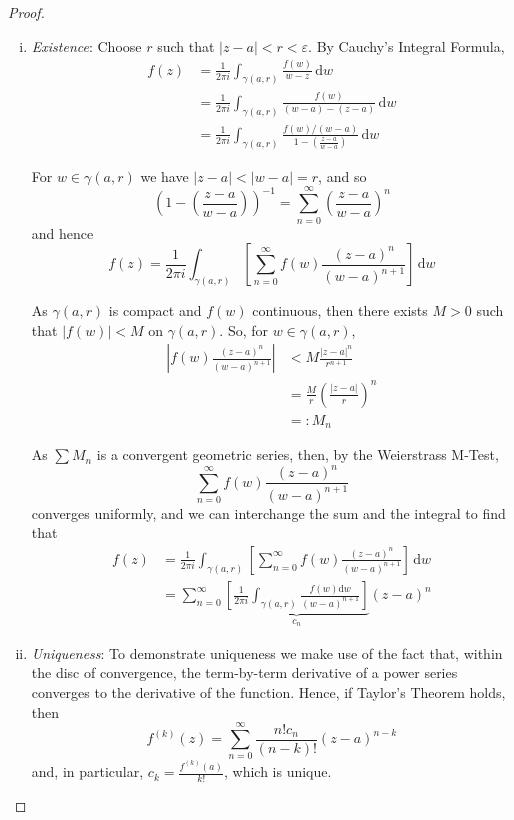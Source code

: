 \documentclass[10pt,fleqn]{article}
\newcommand{\diff}{\,\mathrm{d}}
\newcommand{\eps}{\varepsilon}
\theoremstyle{definition} \newtheorem{defn}{Definition}[section]
\theoremstyle{plain}      \newtheorem{thm}[defn]{Theorem}
\theoremstyle{definition} \newtheorem{prop}[defn]{Proposition}
\theoremstyle{plain}      \newtheorem{lem}[defn]{Lemma}
\theoremstyle{definition} \newtheorem{cor}[defn]{Corollary}
\theoremstyle{definition} \newtheorem{ex}[defn]{Example}
\theoremstyle{definition} \newtheorem{rem}[defn]{Remark}
\begin{document}
\begin{proof}
    \begin{enumerate}[(i)]
        \item \emph{Existence}:
        Choose $r$ such that $|z-a|<r<\eps$.
        By Cauchy's Integral Formula,
        \begin{align*}
            f(z)
            &=
            \frac{1}{2\pi i}\int_{\gamma(a,r)}\frac{f(w)}{w-z}\diff w\\
            &=
            \frac{1}{2\pi i}\int_{\gamma(a,r)}\frac{f(w)}{(w-a)-(z-a)}\diff w\\
            &=
            \frac{1}{2\pi i}\int_{\gamma(a,r)}\frac{f(w)/(w-a)}{1-\left(\frac{z-a}{w-a}\right)}\diff w
        \end{align*}

        For $w\in\gamma(a,r)$ we have $|z-a|<|w-a|=r$, and so
        \[
            \left(1-\left(\frac{z-a}{w-a}\right)\right)^{-1}=
            \sum_{n=0}^{\infty}\left(\frac{z-a}{w-a}\right)^n
        \]
        and hence
        \[
            f(z)=
            \frac{1}{2\pi i}\int_{\gamma(a,r)}\left[\sum_{n=0}^{\infty}f(w)\frac{(z-a)^n}{(w-a)^{n+1}}\right]\diff w
        \]

        As $\gamma(a,r)$ is compact and $f(w)$ continuous, then there exists $M>0$ such that $|f(w)|<M$ on $\gamma(a,r)$.
        So, for $w\in\gamma(a,r)$,
        \begin{align*}
            \left|f(w)\frac{(z-a)^n}{(w-a)^{n+1}}\right|
            &<
            M\frac{|z-a|^n}{r^{n+1}}\\
            &=
            \frac{M}{r}\left(\frac{|z-a|}{r}\right)^n\\
            &=:
            M_n
        \end{align*}

        As $\sum M_n$ is a convergent geometric series, then, by the Weierstrass M-Test,
        \[
            \sum_{n=0}^{\infty}f(w)\frac{(z-a)^n}{(w-a)^{n+1}}
        \]
        converges uniformly, and we can interchange the sum and the integral to find that
        \begin{align*}
            f(z)
            &=
            \frac{1}{2\pi i}\int_{\gamma(a,r)}\left[\sum_{n=0}^{\infty}f(w)\frac{(z-a)^n}{(w-a)^{n+1}}\right]\diff w\\
            &=
            \sum_{n=0}^{\infty}\underbrace{\left[\frac{1}{2\pi i}\int_{\gamma(a,r)}\frac{f(w)\mathrm{d}w}{(w-a)^{n+1}}\right]}_{c_n}(z-a)^n
        \end{align*}
        \item \emph{Uniqueness}:
        To demonstrate uniqueness we make use of the fact that, within the disc of convergence, the term-by-term derivative of a power series converges to the derivative of the function.
        Hence, if Taylor's Theorem holds, then
        \[
            f^{(k)}(z)=
            \sum_{n=0}^{\infty}\frac{n!c_n}{(n-k)!}(z-a)^{n-k}
        \]
        and, in particular, $c_k=\frac{f^{(k)}(a)}{k!}$, which is unique.
    \end{enumerate}
\end{proof}
\end{document}
